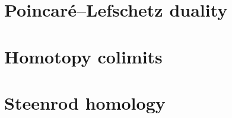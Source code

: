 

\chapter{Poincaré–Lefschetz duality}



\chapter{Homotopy colimits}



\chapter{Steenrod homology}





